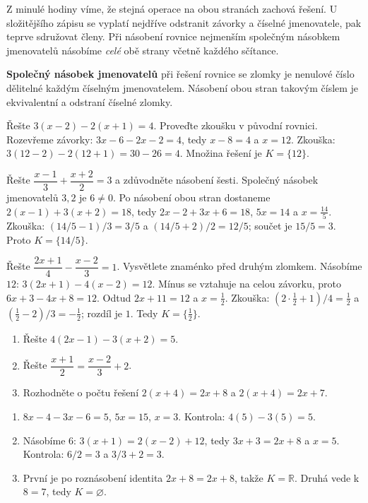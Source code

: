 \documentclass[11pt,a4paper]{article}
\begin{document}
Z minulé hodiny víme, že stejná operace na obou stranách zachová řešení. U složitějšího zápisu se vyplatí nejdříve odstranit závorky a číselné jmenovatele, pak teprve sdružovat členy. Při násobení rovnice nejmenším společným násobkem jmenovatelů násobíme \emph{celé} obě strany včetně každého sčítance.
\begin{definiceBox}
\textbf{Společný násobek jmenovatelů} při řešení rovnice se zlomky je nenulové číslo dělitelné každým číselným jmenovatelem. Násobení obou stran takovým číslem je ekvivalentní a odstraní číselné zlomky.
\end{definiceBox}
\begin{prikladReseniBox}
Řešte $3(x-2)-2(x+1)=4$. Proveďte zkoušku v původní rovnici.
\tcblower
Rozevřeme závorky: $3x-6-2x-2=4$, tedy $x-8=4$ a $x=12$. Zkouška: $3(12-2)-2(12+1)=30-26=4$. Množina řešení je $K=\{12\}$.
\end{prikladReseniBox}
\begin{prikladReseniBox}
Řešte $\dfrac{x-1}{3}+\dfrac{x+2}{2}=3$ a zdůvodněte násobení šesti.
\tcblower
Společný násobek jmenovatelů $3,2$ je $6\ne0$. Po násobení obou stran dostaneme $2(x-1)+3(x+2)=18$, tedy $2x-2+3x+6=18$, $5x=14$ a $x=\frac{14}{5}$. Zkouška: $(14/5-1)/3=3/5$ a $(14/5+2)/2=12/5$; součet je $15/5=3$. Proto $K=\{14/5\}$.
\end{prikladReseniBox}
\begin{prikladReseniBox}
Řešte $\dfrac{2x+1}{4}-\dfrac{x-2}{3}=1$. Vysvětlete znaménko před druhým zlomkem.
\tcblower
Násobíme $12$: $3(2x+1)-4(x-2)=12$. Mínus se vztahuje na celou závorku, proto $6x+3-4x+8=12$. Odtud $2x+11=12$ a $x=\frac12$. Zkouška: $(2\cdot\frac12+1)/4=\frac12$ a $(\frac12-2)/3=-\frac12$; rozdíl je $1$. Tedy $K=\{\frac12\}$.
\end{prikladReseniBox}
\begin{zadaniReseniBox}
\begin{enumerate}[label=\alph*)]
\item Řešte $4(2x-1)-3(x+2)=5$.
\item Řešte $\dfrac{x+1}{2}=\dfrac{x-2}{3}+2$.
\item Rozhodněte o počtu řešení $2(x+4)=2x+8$ a $2(x+4)=2x+7$.
\end{enumerate}
\tcblower
\begin{enumerate}[label=\alph*)]
\item $8x-4-3x-6=5$, $5x=15$, $x=3$. Kontrola: $4(5)-3(5)=5$.
\item Násobíme $6$: $3(x+1)=2(x-2)+12$, tedy $3x+3=2x+8$ a $x=5$. Kontrola: $6/2=3$ a $3/3+2=3$.
\item První je po roznásobení identita $2x+8=2x+8$, takže $K=\mathbb R$. Druhá vede k $8=7$, tedy $K=\varnothing$.
\end{enumerate}
\end{zadaniReseniBox}
\end{document}
